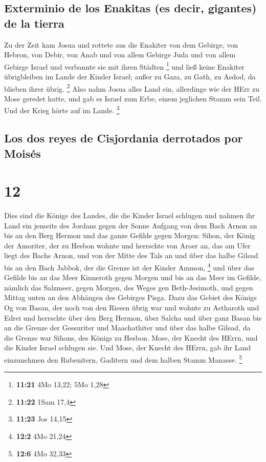 \hypertarget{exterminio-de-los-enakitas-es-decir-gigantes-de-la-tierra}{%
\subsection{Exterminio de los Enakitas (es decir, gigantes) de la
tierra}\label{exterminio-de-los-enakitas-es-decir-gigantes-de-la-tierra}}

 Zu der Zeit kam Josua und rottete aus die Enakiter von
dem Gebirge, von Hebron, von Debir, von Anab und von allem Gebirge Juda
und von allem Gebirge Israel und verbannte sie mit ihren Städten
\footnote{\textbf{11:21} 4Mo 13,22; 5Mo 1,28}  und ließ
keine Enakiter übrigbleiben im Lande der Kinder Israel; außer zu Gaza,
zu Gath, zu Asdod, da blieben ihrer übrig. \footnote{\textbf{11:22} 1Sam
  17,4}  Also nahm Josua alles Land ein, allerdinge wie
der HErr zu Mose geredet hatte, und gab es Israel zum Erbe, einem
jeglichen Stamm sein Teil. Und der Krieg hörte auf im Lande. \footnote{\textbf{11:23}
  Jos 14,15}

\hypertarget{los-dos-reyes-de-cisjordania-derrotados-por-moisuxe9s}{%
\subsection{Los dos reyes de Cisjordania derrotados por
Moisés}\label{los-dos-reyes-de-cisjordania-derrotados-por-moisuxe9s}}

\hypertarget{section-11}{%
\section{12}\label{section-11}}

 Dies sind die Könige des Landes, die die Kinder Israel
schlugen und nahmen ihr Land ein jenseits des Jordans gegen der Sonne
Aufgang von dem Bach Arnon an bis an den Berg Hermon und das ganze
Gefilde gegen Morgen:  Sihon, der König der Amoriter, der
zu Hesbon wohnte und herrschte von Aroer an, das am Ufer liegt des Bachs
Arnon, und von der Mitte des Tals an und über das halbe Gilead bis an
den Bach Jabbok, der die Grenze ist der Kinder Ammon, \footnote{\textbf{12:2}
  4Mo 21,24}  und über das Gefilde bis an das Meer
Kinneroth gegen Morgen und bis an das Meer im Gefilde, nämlich das
Salzmeer, gegen Morgen, des Weges gen Beth-Jesimoth, und gegen Mittag
unten an den Abhängen des Gebirges Pisga.  Dazu das Gebiet
des Königs Og von Basan, der noch von den Riesen übrig war und wohnte zu
Astharoth und Edrei  und herrschte über den Berg Hermon,
über Salcha und über ganz Basan bis an die Grenze der Gessuriter und
Maachathiter und über das halbe Gilead, da die Grenze war Sihons, des
Königs zu Hesbon.  Mose, der Knecht des HErrn, und die
Kinder Israel schlugen sie. Und Mose, der Knecht des HErrn, gab ihr Land
einzunehmen den Rubenitern, Gaditern und dem halben Stamm Manasse.
\footnote{\textbf{12:6} 4Mo 32,33}

